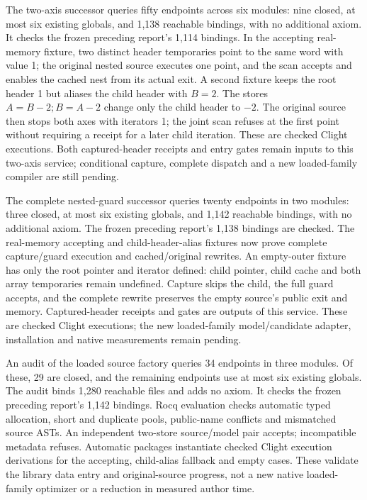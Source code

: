 The two-axis successor queries fifty endpoints across six modules: nine
closed, at most six existing globals, and 1,138 reachable bindings, with no
additional axiom. It checks the frozen preceding report's 1,114 bindings.
In the accepting real-memory fixture, two distinct header temporaries point
to the same word with value 1; the original nested source executes one point,
and the scan accepts and enables the cached nest from its actual exit. A
second fixture keeps the root header 1 but aliases the child header with
$B=2$. The stores $A=B-2; B=A-2$ change only the child header to $-2$.
The original source then stops both axes with iterators 1; the joint scan
refuses at the first point without requiring a receipt for a later child
iteration. These are checked Clight executions. Both captured-header receipts
and entry gates remain inputs to this two-axis service; conditional capture,
complete dispatch and a new loaded-family compiler are still pending.

The complete nested-guard successor queries twenty endpoints in two modules:
three closed, at most six existing globals, and 1,142 reachable bindings,
with no additional axiom. The frozen preceding report's 1,138 bindings are
checked. The real-memory accepting and child-header-alias fixtures now prove
complete capture/guard execution and cached/original rewrites. An empty-outer
fixture has only the root pointer and iterator defined: child pointer, child
cache and both array temporaries remain undefined. Capture skips the child,
the full guard accepts, and the complete rewrite preserves the empty
source's public exit and memory. Captured-header receipts and gates are
outputs of this service. These are checked Clight executions; the new
loaded-family model/candidate adapter, installation and native measurements
remain pending.

An audit of the loaded source factory queries 34 endpoints in three modules.
Of these, 29 are closed, and the remaining endpoints use at most six existing
globals. The audit binds 1,280 reachable files and adds no axiom.
It checks the frozen preceding
report's 1,142 bindings. Rocq evaluation checks automatic typed allocation,
short and duplicate pools, public-name conflicts and mismatched source ASTs.
An independent two-store source/model pair accepts; incompatible metadata
refuses. Automatic packages instantiate checked Clight execution derivations
for the accepting, child-alias fallback and empty cases. These validate the
library data entry and original-source progress, not a new native loaded-family
optimizer or a reduction in measured author time.

